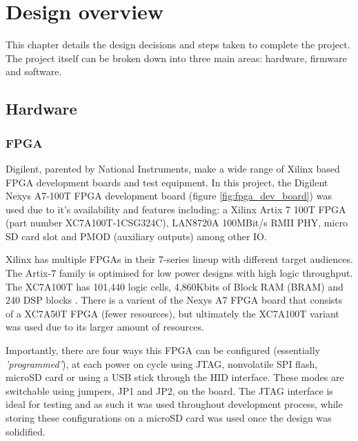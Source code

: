 
\chapter[Design overview]{Design overview}
\label{chap:methodology}	%
\pagestyle{headings}

This chapter details the design decisions and steps taken to complete the project. The project itself can be broken down into three main areas: hardware, firmware and software. 


\section{Hardware}
\subsection{FPGA}
Digilent, parented by National Instruments, make a wide range of Xilinx based FPGA development boards and test equipment. In this project, the Digilent Nexys A7-100T FPGA development board (figure \ref{fig:fpga_dev_board}) was used due to it's availability and features including: a Xilinx Artix 7 100T FPGA (part number XC7A100T-1CSG324C), LAN8720A 100MBit/s RMII PHY, micro SD card slot and PMOD (auxiliary outputs) among other IO. 

Xilinx has multiple FPGAs in their 7-series lineup with different target audiences. The Artix-7 family is optimised for low power designs with high logic throughput. The XC7A100T has 101,440 logic cells, 4,860Kbits of Block RAM (BRAM) and 240 DSP blocks \cite{Xilinx7SeriesDatasheet}. There is a varient of the Nexys A7 FPGA board that consists of a XC7A50T FPGA (fewer resources), but ultimately the XC7A100T variant was used due to its larger amount of resources.  

Importantly, there are four ways this FPGA can be configured (essentially \textit{'programmed'}), at each power on cycle using JTAG, nonvolatile SPI flash, microSD card or using a USB stick through the HID interface. These modes are switchable using jumpers, JP1 and JP2, on the board. The JTAG interface is ideal for testing and as such it was used throughout development process, while storing these configurations on a microSD card was used once the design was solidified. 

